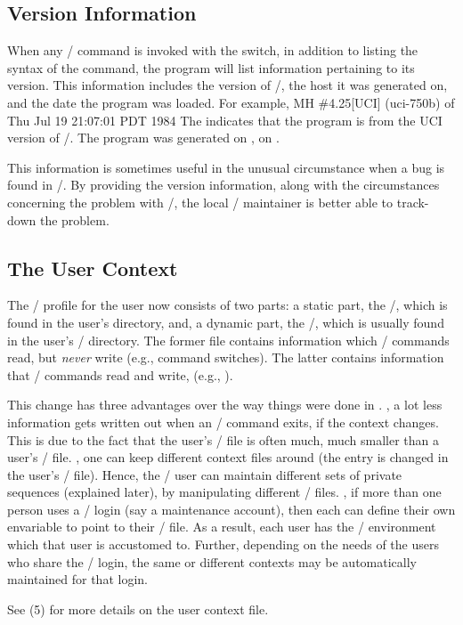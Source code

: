 \subsection{Version Information}
When any \MH/ command is invoked with the  switch,
in addition to listing the syntax of the command,
the program will list information pertaining to its version.
This information includes the version of \MH/,
the host it was generated on,
and the date the program was loaded.
For example,
\example MH \#4.25[UCI] (uci-750b) of Thu Jul 19 21:07:01 PDT 1984\endexample
The  indicates that the program is from the UCI 
version of \MH/.
The program was generated on ,
on .
\par
This information is sometimes useful in the unusual circumstance when a bug
is found in \MH/.
By providing the version information,
along with the circumstances concerning the problem with \MH/,
the local \MH/ maintainer is better able to track-down the problem.
\subsection{The User Context}
The \MH/ profile for the user now consists of two parts:
a static part, the \profile/, which is found in the user's 
directory,
and, a dynamic part, the \context/, which is usually found in the user's \MH/
directory.
The former file contains information which \MH/ commands read,
but {\it never\/} write
(e.g., command switches).
The latter contains information that \MH/ commands read and write,
(e.g., ).
\par
This change has three advantages over the way things were done in .
,
a lot less information gets written out when an \MH/ command exits,
if the context changes.
This is due to the fact that the user's \context/ file is often much,
much smaller than a user's \profile/ file.
,
one can keep different context files around
(the entry  is changed in the user's \profile/ file).%
Hence, the \MH/ user can maintain different sets of private sequences
(explained later),
by manipulating different \context/ files.
,
if more than one person uses a \unix/ login
(say a maintenance account),
then each can define their own  envariable to point to their
\profile/ file.
As a result,
each user has the \MH/ environment which that user is accustomed to.
Further,
depending on the needs of the users who share the \unix/ login,
the same or different contexts may be automatically maintained for that login.
\par
See (5) for more details on the user context file.
